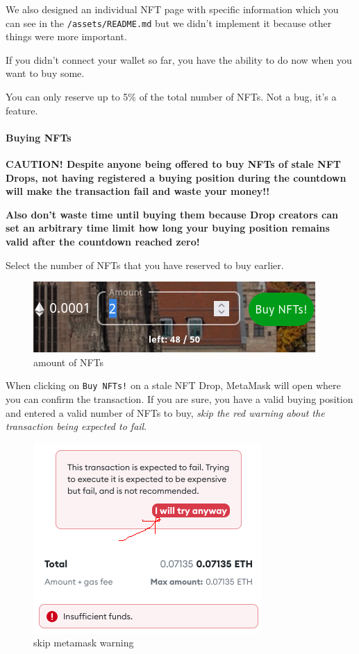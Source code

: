 \documentclass[
]{article}
\begin{document}
We also designed an individual NFT page with specific information which
you can see in the \texttt{/assets/README.md} but we didn't implement it
because other things were more important.

If you didn't connect your wallet so far, you have the ability to do now
when you want to buy some.

You can only reserve up to 5\% of the total number of NFTs. Not a bug,
it's a feature.

\hypertarget{buying-nfts}{%
\paragraph{Buying NFTs}\label{buying-nfts}}

\textbf{CAUTION! Despite anyone being offered to buy NFTs of stale NFT
Drops, not having registered a buying position during the countdown will
make the transaction fail and waste your money!!}

\textbf{Also don't waste time until buying them because Drop creators
can set an arbitrary time limit how long your buying position remains
valid after the countdown reached zero!}

Select the number of NFTs that you have reserved to buy earlier.

\begin{figure}
\centering
\includegraphics{images/NFT_drop_dashboard.png}
\caption{amount of NFTs}
\end{figure}\newpage

When clicking on \texttt{Buy\ NFTs!} on a stale NFT Drop, MetaMask will
open where you can confirm the transaction. If you are sure, you have a
valid buying position and entered a valid number of NFTs to buy,
\emph{skip the red warning about the transaction being expected to
fail}.

\begin{figure}
\centering
\includegraphics{images/metamask_confirmation.png}
\caption{skip metamask warning}
\end{figure}\newpage
\end{document}
